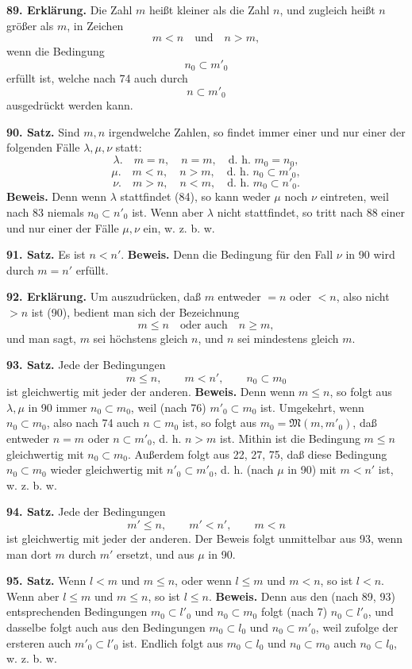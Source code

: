 \documentclass[11pt]{article}
\newcommand{\Mf}{\mathfrak{M}}
\newcommand{\partof}{\mathrel{\subset}}
\begin{document}
\noindent\textbf{89. Erklärung.} Die Zahl $m$ heißt kleiner als die Zahl $n$, und zugleich heißt $n$ größer als $m$, in Zeichen
\[
m<n \quad\text{und}\quad n>m,
\]
wenn die Bedingung
\[
n_0\partof m'_0
\]
erfüllt ist, welche nach 74 auch durch
\[
n\partof m'_0
\]
ausgedrückt werden kann.

\noindent\textbf{90. Satz.} Sind $m,n$ irgendwelche Zahlen, so findet immer einer und nur einer der folgenden Fälle $\lambda,\mu,\nu$ statt:
\[
\lambda.\quad m=n,\quad n=m,\quad \text{d. h. } m_0=n_0,
\]
\[
\mu.\quad m<n,\quad n>m,\quad \text{d. h. } n_0\partof m'_0,
\]
\[
\nu.\quad m>n,\quad n<m,\quad \text{d. h. } m_0\partof n'_0.
\]
\textbf{Beweis.} Denn wenn $\lambda$ stattfindet (84), so kann weder $\mu$ noch $\nu$ eintreten, weil nach 83 niemals $n_0\partof n'_0$ ist. Wenn aber $\lambda$ nicht stattfindet, so tritt nach 88 einer und nur einer der Fälle $\mu,\nu$ ein, w. z. b. w.

\noindent\textbf{91. Satz.} Es ist $n<n'$. \textbf{Beweis.} Denn die Bedingung für den Fall $\nu$ in 90 wird durch $m=n'$ erfüllt.

\noindent\textbf{92. Erklärung.} Um auszudrücken, daß $m$ entweder $=n$ oder $<n$, also nicht $>n$ ist (90), bedient man sich der Bezeichnung
\[
m\le n \quad\text{oder auch}\quad n\ge m,
\]
und man sagt, $m$ sei höchstens gleich $n$, und $n$ sei mindestens gleich $m$.

\noindent\textbf{93. Satz.} Jede der Bedingungen
\[
m\le n,\qquad m<n',\qquad n_0\partof m_0
\]
ist gleichwertig mit jeder der anderen. \textbf{Beweis.} Denn wenn $m\le n$, so folgt aus $\lambda,\mu$ in 90 immer $n_0\partof m_0$, weil (nach 76) $m'_0\partof m_0$ ist. Umgekehrt, wenn $n_0\partof m_0$, also nach 74 auch $n\partof m_0$ ist, so folgt aus $m_0=\Mf(m,m'_0)$, daß entweder $n=m$ oder $n\partof m'_0$, d. h. $n>m$ ist. Mithin ist die Bedingung $m\le n$ gleichwertig mit $n_0\partof m_0$. Außerdem folgt aus 22, 27, 75, daß diese Bedingung $n_0\partof m_0$ wieder gleichwertig mit $n'_0\partof m'_0$, d. h. (nach $\mu$ in 90) mit $m<n'$ ist, w. z. b. w.

\noindent\textbf{94. Satz.} Jede der Bedingungen
\[
m'\le n,\qquad m'<n',\qquad m<n
\]
ist gleichwertig mit jeder der anderen. Der Beweis folgt unmittelbar aus 93, wenn man dort $m$ durch $m'$ ersetzt, und aus $\mu$ in 90.

\noindent\textbf{95. Satz.} Wenn $l<m$ und $m\le n$, oder wenn $l\le m$ und $m<n$, so ist $l<n$. Wenn aber $l\le m$ und $m\le n$, so ist $l\le n$. \textbf{Beweis.} Denn aus den (nach 89, 93) entsprechenden Bedingungen $m_0\partof l'_0$ und $n_0\partof m_0$ folgt (nach 7) $n_0\partof l'_0$, und dasselbe folgt auch aus den Bedingungen $m_0\partof l_0$ und $n_0\partof m'_0$, weil zufolge der ersteren auch $m'_0\partof l'_0$ ist. Endlich folgt aus $m_0\partof l_0$ und $n_0\partof m_0$ auch $n_0\partof l_0$, w. z. b. w.
\end{document}
